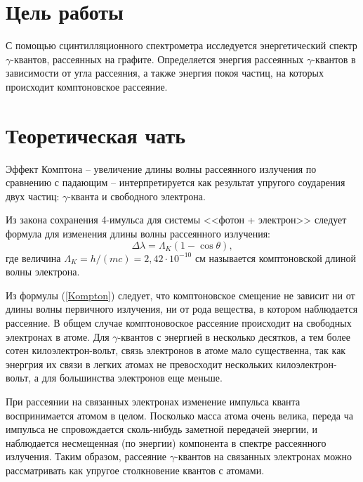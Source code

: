 


    

    \section*{Цель работы}

    С помощью сцинтилляционного спектрометра исследуется энергетический спектр $\gamma$-квантов, 
    рассеянных на графите. 
    Определяется энергия рассеянных $\gamma$-квантов в зависимости от угла рассеяния, 
    а также энергия покоя частиц, на которых происходит комптоновское рассеяние.

    \section*{Теоретическая чать}

    Эффект Комптона -- увеличение длины волны рассеянного излучения по сравнению с падающим -- интерпретируется как результат упругого соударения двух частиц: $\gamma$-кванта и свободного электрона.
	
	Из закона сохранения 4-имульса для системы <<фотон + электрон>> следует формула для изменения длины волны рассеянного излучения:
	\begin{equation}
		\label{Kompton}
		\tag{$\star$}
		\Delta \lambda = \Lambda_K(1-\cos\theta),
	\end{equation}
	где величина $\Lambda_K = h/(mc) = 2,42 \cdot 10^{-10}$ см называется комптоновской длиной волны электрона.
	
	Из формулы (\ref{Kompton}) следует, что комптоновское смещение не зависит ни от длины волны первичного излучения, ни от рода вещества, в котором наблюдается рассеяние. В общем случае комптоновоское рассеяние происходит на свободных электронах в атоме. Для $\gamma$-квантов с энергией в несколько десятков, а тем более сотен килоэлектрон-вольт, связь электронов в атоме мало существенна, так как энергрия их связи в легких атомах не превосходит нескольких килоэлектрон-вольт, а для большинства электронов еще меньше.
	
	При рассеянии на связанных электронах изменение импульса кванта воспринимается атомом в целом. Посколько масса атома очень велика, переда ча импульса не спровождается сколь-нибудь заметной передачей энергии, и наблюдается несмещенная (по энергии) компонента в спектре рассеянного излучения. Таким образом, рассеяние $\gamma$-квантов на связанных электронах можно рассматривать как упругое столкновение квантов с атомами.
	
